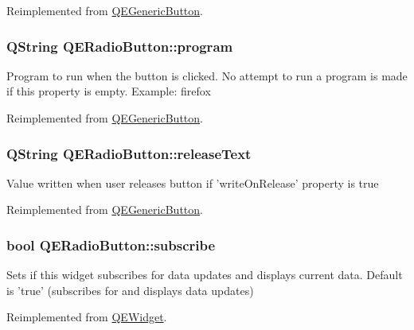Reimplemented from \hyperlink{classQEGenericButton}{QEGenericButton}.

\hypertarget{classQERadioButton_ac2bf379502ab5aa55f63fa2737dc9f7b}{
\subsubsection[{program}]{\setlength{\rightskip}{0pt plus 5cm}QString QERadioButton::program}}
\label{classQERadioButton_ac2bf379502ab5aa55f63fa2737dc9f7b}
Program to run when the button is clicked. No attempt to run a program is made if this property is empty. Example: firefox 

Reimplemented from \hyperlink{classQEGenericButton}{QEGenericButton}.

\hypertarget{classQERadioButton_a5e0edea929429e6d0ba6bc8e6013ae7b}{
\subsubsection[{releaseText}]{\setlength{\rightskip}{0pt plus 5cm}QString QERadioButton::releaseText}}
\label{classQERadioButton_a5e0edea929429e6d0ba6bc8e6013ae7b}
Value written when user releases button if 'writeOnRelease' property is true 

Reimplemented from \hyperlink{classQEGenericButton}{QEGenericButton}.

\hypertarget{classQERadioButton_a7a75de07f11a61927d1442756f697345}{
\subsubsection[{subscribe}]{\setlength{\rightskip}{0pt plus 5cm}bool QERadioButton::subscribe}}
\label{classQERadioButton_a7a75de07f11a61927d1442756f697345}
Sets if this widget subscribes for data updates and displays current data. Default is 'true' (subscribes for and displays data updates) 

Reimplemented from \hyperlink{classQEWidget}{QEWidget}.

